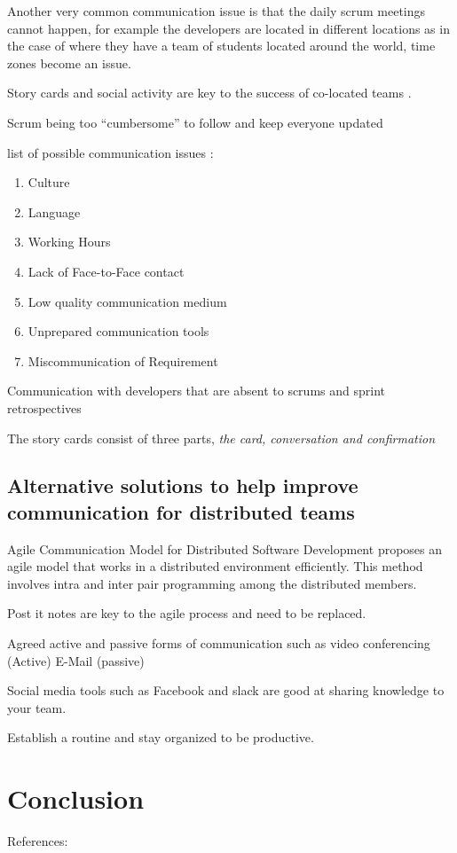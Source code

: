 \documentclass{scrartcl}
\begin{document}
Another very common communication issue is that the daily scrum meetings cannot happen, for example the developers are located in different locations as in the case of \cite{scharff2012} where they have a team of students located around the world, time zones become an issue.

Story cards and social activity are key to the success of co-located teams \cite{abdullah2011}. 

Scrum being too ``cumbersome'' to follow and keep everyone updated \cite{scharff2012}

list of possible communication issues \cite{joshi2013}:

\begin{enumerate}
\item Culture
\item Language
\item Working Hours
\item Lack of Face-to-Face contact
\item Low quality communication medium
\item Unprepared communication tools
\item Miscommunication of Requirement
\end{enumerate}


Communication with developers that are absent to scrums and sprint retrospectives \cite{scharff2012}

The story cards consist of three parts, \textit{the card, conversation and confirmation} \cite{abdullah2011}


\subsection{Alternative solutions to help improve communication for distributed teams}

Agile Communication Model for Distributed Software Development \cite{bhalerao2010} proposes an agile model that works in a distributed environment efficiently. This method involves intra and inter pair programming among the distributed members.

Post it notes are key to the agile process and need to be replaced.

Agreed active and passive forms of communication such as video conferencing (Active) E-Mail (passive) \cite{joshi2013}

Social media tools such as Facebook and slack are good at sharing knowledge to your team.

 Establish a routine and stay organized to be productive.

\section{Conclusion}


References:
\cite{bhalerao2010}
\cite{scharff2012}
\cite{abdullah2011}
\cite{joshi2013}
\cite{krasteva2008}
\cite{williams2012}
\cite{marjaie2011}
\cite{kumar2015}



\end{document}
